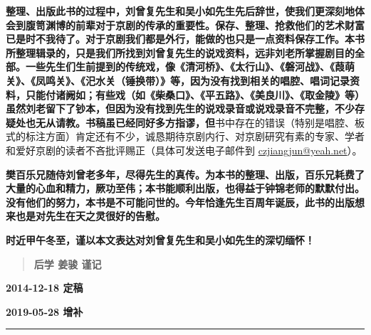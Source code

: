 \textbf{整理、出版此书的过程中，刘曾复先生和吴小如先生先后辞世，使我们更深刻地体会到腹笥渊博的前辈对于京剧的传承的重要性。保存、整理、抢救他们的艺术财富已是时不我待了。对于京剧我们都是外行，能做的也只是一点资料保存工作。本书所整理辑录的，只是我们所找到刘曾复先生的说戏资料，远非刘老所掌握剧目的全部。一些先生们生前提到的传统戏，像《清河桥》、《太行山》、《磐河战》、《葭萌关》、《凤鸣关》、《汜水关（锤换带）》等，因为没有找到相关的唱腔、唱词记录资料，只能付诸阙如；有些戏（如《柴桑口》、《平五路》、《美良川》、《取金陵》等）虽然刘老留下了钞本，但因为没有找到先生的说戏录音或说戏录音不完整，不少存疑处也无从请教。书稿虽已经同好多方指谬，但}书中存在的错误（特别是唱腔、板式的标注方面）肯定还有不少，诚恳期待京剧内行、对京剧研究有素的专家、学者和爱好京剧的读者不吝批评赐正（具体可发送电子邮件到
\href{mailto:czjiangjun@yeah.net}{{czjiangjun@yeah.net}}）。

\textbf{樊百乐兄随侍刘曾老多年，尽得先生的真传。为本书的整理、出版，百乐兄耗费了大量的心血和精力，厥功至伟；本书能顺利出版，也得益于钟锦老师的默默付出。没有他们的努力，本书是不可能问世的。今年恰逢先生百周年诞辰，此书的出版想来也是对先生在天之灵很好的告慰。}

\textbf{时近甲午冬至，谨以本文表达对刘曾复先生和吴小如先生的深切缅怀！}

\begin{quote}
\textbf{后学 姜骏 谨记}
\end{quote}

\textbf{2014-12-18 定稿}

\textbf{2019-05-28 增补}

\begin{center}\rule{0.5\linewidth}{0.5pt}\end{center}

